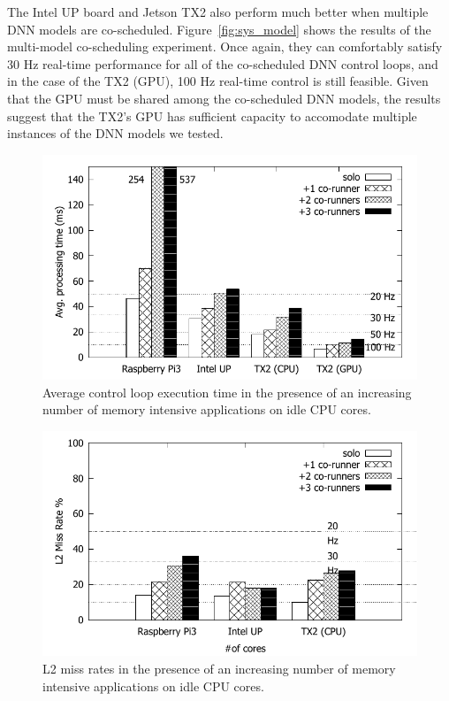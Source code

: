The Intel UP board and Jetson TX2 also perform much better when multiple DNN models
are co-scheduled. Figure~\ref{fig:sys_model} shows the results of the
multi-model co-scheduling experiment. Once again, they can comfortably
satisfy 30 Hz real-time performance for all of the co-scheduled DNN control
loops, and in the case of the TX2 (GPU), 100 Hz real-time control is still
feasible. Given that the GPU must be shared among the co-scheduled DNN
models, the results suggest that the TX2's GPU has sufficient capacity to
accomodate multiple instances of the DNN models we tested.

\begin{figure}[h]
  \centering
  \includegraphics[width=.7\textwidth]{figs/compare_benchmark}
  \caption{Average control loop execution time in the presence of an
    increasing number of memory intensive applications on idle CPU cores.}
  \label{fig:sys_bench}
\end{figure} 

\begin{figure}[h]
  \centering
  \includegraphics[width=.7\textwidth]{figs/compare_l2missrate}
  \caption{L2 miss rates in the presence of an increasing number of 
			memory intensive applications on idle CPU cores.}
  \label{fig:sys_l2miss}
\end{figure}

